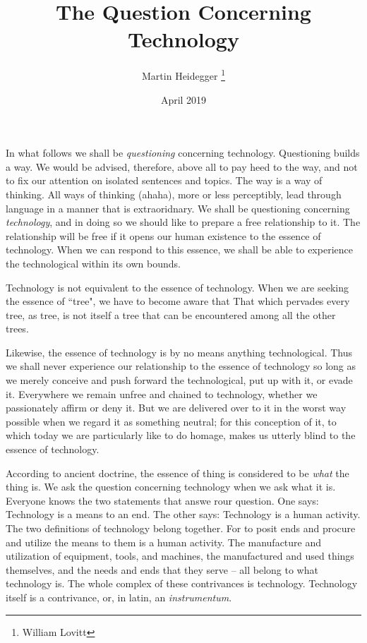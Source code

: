 \documentclass[12pt]{article}
\title{The Question Concerning Technology}
\author{Martin Heidegger \thanks{William Lovitt}}
\date{April 2019}
\begin{document}
\maketitle

In what follows we shall be \textit{questioning} concerning technology. Questioning builds a way. We would be advised, therefore, above all to pay heed to the way, and not to fix our attention on isolated sentences and topics. The way is a way of thinking. All ways of thinking (ahaha), more or less perceptibly, lead through language in a manner that is extraoridnary. We shall be questioning concerning \textit{technology}, and in doing so we should like to prepare a free relationship to it. The relationship will be free if it opens our human existence to the essence of technology. When we can respond to this essence, we shall be able to experience the technological within its own bounds.

Technology is not equivalent to the essence of technology. When we are seeking the essence of ``tree", we have to become aware that That which pervades every tree, as tree, is not itself a tree that can be encountered among all the other trees.

Likewise, the essence of technology is by no means anything technological. Thus we shall never experience our relationship to the essence of technology so long as we merely conceive and push forward the technological, put up with it, or evade it. Everywhere we remain unfree and chained to technology, whether we passionately affirm or deny it. But we are delivered over to it in the worst way possible when we regard it as something neutral; for this conception of it, to which today we are particularly like to do homage, makes us utterly blind to the essence of technology.

According to ancient doctrine, the essence of thing is considered to be \textit{what} the thing is. We ask the question concerning technology when we ask what it is. Everyone knows the two statements that answe rour question. One says: Technology is a means to an end. The other says: Technology is a human activity. The two definitions of technology belong together. For to posit ends and procure and utilize the means to them is a human activity. The manufacture and utilization of equipment, tools, and machines, the manufactured and used things themselves, and the needs and ends that they serve -- all belong to what technology is. The whole complex of these contrivances is technology. Technology itself is a contrivance, or, in latin, an \textit{instrumentum}.
\end{document}
